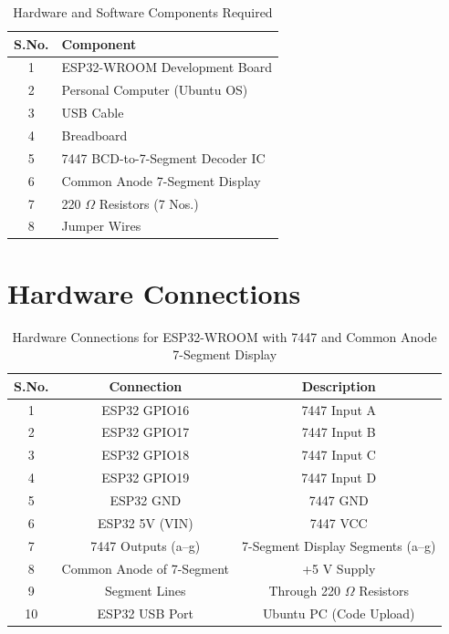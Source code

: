 \documentclass[12pt,a4paper]{article}
\begin{document}
\begin{table}[h]
\centering
\begin{tabular}{|c|l|}
\hline
\textbf{S.No.} & \textbf{Component} \\ \hline
1 & ESP32-WROOM Development Board \\ \hline
2 & Personal Computer (Ubuntu OS) \\ \hline
3 & USB Cable \\ \hline
4 & Breadboard \\ \hline
5 & 7447 BCD-to-7-Segment Decoder IC \\ \hline
6 & Common Anode 7-Segment Display \\ \hline
7 & 220 $\Omega$ Resistors (7 Nos.) \\ \hline
8 & Jumper Wires \\ \hline

\end{tabular}
\caption{Hardware and Software Components Required}
\label{tab:hardware}
\end{table}
\section*{Hardware Connections}

\begin{table}[h]
\centering
\begin{tabular}{|c|c|c|}
\hline
\textbf{S.No.} & \textbf{Connection} & \textbf{Description} \\ \hline
1 & ESP32 GPIO16 & 7447 Input A \\ \hline
2 & ESP32 GPIO17 & 7447 Input B \\ \hline
3 & ESP32 GPIO18 & 7447 Input C \\ \hline
4 & ESP32 GPIO19 & 7447 Input D \\ \hline
5 & ESP32 GND & 7447 GND \\ \hline
6 & ESP32 5V (VIN) & 7447 VCC \\ \hline
7 & 7447 Outputs (a--g) & 7-Segment Display Segments (a--g) \\ \hline
8 & Common Anode of 7-Segment & +5 V Supply \\ \hline
9 & Segment Lines & Through 220 $\Omega$ Resistors \\ \hline
10 & ESP32 USB Port & Ubuntu PC (Code Upload) \\ \hline
\end{tabular}
\caption{Hardware Connections for ESP32-WROOM with 7447 and Common Anode 7-Segment Display}
\label{tab:hardware_connections}
\end{table}
\end{document}
